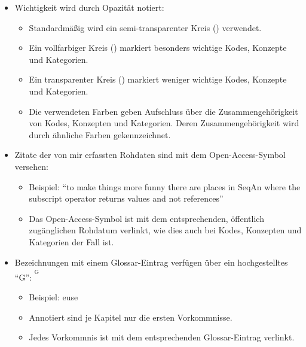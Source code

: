 \begin{itemize}
  \item Wichtigkeit wird durch Opazität notiert: \,\,
  \begin{itemize}
    \item Standardmäßig wird ein semi-transparenter Kreis () verwendet.
    \item Ein vollfarbiger Kreis () markiert besonders wichtige Kodes, Konzepte und Kategorien.
    \item Ein transparenter Kreis () markiert weniger wichtige Kodes, Konzepte und Kategorien.
    \item Die verwendeten Farben geben Aufschluss über die Zusammengehörigkeit von Kodes, Konzepten und Kategorien. Deren Zusammengehörigkeit wird durch ähnliche Farben gekennzeichnet.
  \end{itemize}
  
  \item Zitate der von mir erfassten Rohdaten sind mit dem Open-Access-Symbol versehen:  %
  \begin{itemize}
    \item Beispiel: ``to make things more funny there are places in SeqAn where the subscript operator returns values and not references''
    \item Das Open-Access-Symbol ist mit dem entsprechenden, öffentlich zugänglichen Rohdatum verlinkt, wie dies auch bei Kodes, Konzepten und Kategorien der Fall ist.
  \end{itemize}
  
  \item Bezeichnungen mit einem Glossar-Eintrag verfügen über ein hochgestelltes ``G'': \textsuperscript{\textsuperscript{\tiny G}}
  \begin{itemize}
    \item Beispiel: \gls{euse}
    \item Annotiert sind je Kapitel nur die ersten Vorkommnisse.
    \item Jedes Vorkommnis ist mit dem entsprechenden Glossar-Eintrag verlinkt.
  \end{itemize}
\end{itemize}

